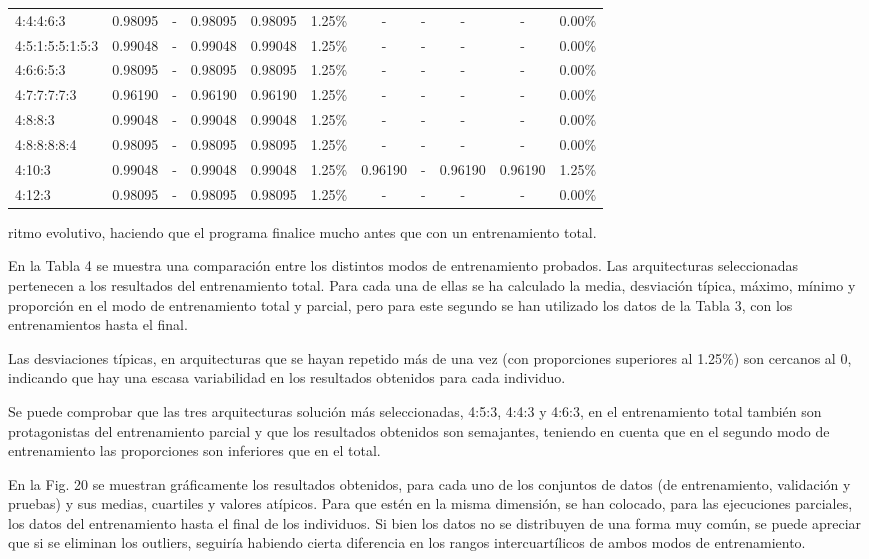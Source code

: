 \documentclass[spanish,a4paper,12pt,twoside]{report}
\begin{document}
\begin{landscape}
\begin{center}
\begin{tabular}{l c c c c r c c c c r}
        4:4:4:6:3 & 0.98095 & - & 0.98095 & 0.98095 & 1.25\% & - & - & - & - & 0.00\% \\
        4:5:1:5:5:1:5:3 & 0.99048 & - & 0.99048 & 0.99048 & 1.25\% & - & - & - & - & 0.00\% \\
        4:6:6:5:3 & 0.98095 & - & 0.98095 & 0.98095 & 1.25\% & - & - & - & - & 0.00\% \\
        4:7:7:7:7:3 & 0.96190 & - & 0.96190 & 0.96190 & 1.25\% & - & - & - & - & 0.00\% \\ 
        4:8:8:3 & 0.99048 & - & 0.99048 & 0.99048 & 1.25\% & - & - & - & - & 0.00\% \\
        4:8:8:8:8:4 & 0.98095 & - & 0.98095 & 0.98095 & 1.25\% & - & - & - & - & 0.00\% \\
        4:10:3 & 0.99048 & - & 0.99048 & 0.99048 & 1.25\% & 0.96190 & - & 0.96190 & 0.96190 & 1.25\% \\
        4:12:3 & 0.98095 & - & 0.98095 & 0.98095 & 1.25\% & - & - & - & - & 0.00\% \\[1ex]
        \hline
      \end{tabular}
    \end{center}
  \end{landscape}
  \noindent ritmo evolutivo, haciendo que el programa finalice mucho antes que con un entrenamiento total. \par
  En la Tabla 4 se muestra una comparación entre los distintos modos de entrenamiento probados. Las arquitecturas seleccionadas pertenecen a los resultados del entrenamiento total. Para cada una de ellas se ha calculado la media, desviación típica, máximo, mínimo y proporción en el modo de entrenamiento total y parcial, pero para este segundo se han utilizado los datos de la Tabla 3, con los entrenamientos hasta el final. \par
  Las desviaciones típicas, en arquitecturas que se hayan repetido más de una vez (con proporciones superiores al 1.25\%) son cercanos al 0, indicando que hay una escasa variabilidad en los resultados obtenidos para cada individuo.\par
  Se puede comprobar que las tres arquitecturas solución más seleccionadas, 4:5:3, 4:4:3 y 4:6:3, en el entrenamiento total también son protagonistas del entrenamiento parcial y que los resultados obtenidos son semajantes, teniendo en cuenta que en el segundo modo de entrenamiento las proporciones son inferiores que en el total. \par
  En la Fig. 20 se muestran gráficamente los resultados obtenidos, para cada uno de los conjuntos de datos (de entrenamiento, validación y pruebas) y sus medias, cuartiles y valores atípicos. Para que estén en la misma dimensión, se han colocado, para las ejecuciones parciales, los datos del entrenamiento hasta el final de los individuos. Si bien los datos no se distribuyen de una forma muy común, se puede apreciar que si se eliminan los outliers, seguiría habiendo cierta diferencia en los rangos intercuartílicos de ambos modos de entrenamiento.
\end{document}

